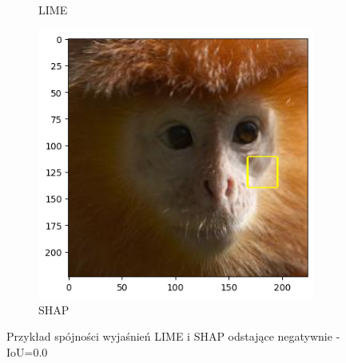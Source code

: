 \begin{figure}[h]
\begin{subfigure}[b]{0.3\textwidth}
		\caption{LIME}  \label{}
	\end{subfigure}
	\begin{subfigure}[b]{0.3\textwidth}
		\centering\includegraphics[width=.9\textwidth]{img/examples/appendix/n02488291_05090_shap}
		\caption{SHAP}
	\end{subfigure}
	\caption{Przykład spójności wyjaśnień LIME i SHAP odstające negatywnie - IoU=0.0}
	\label{}
\end{figure}

